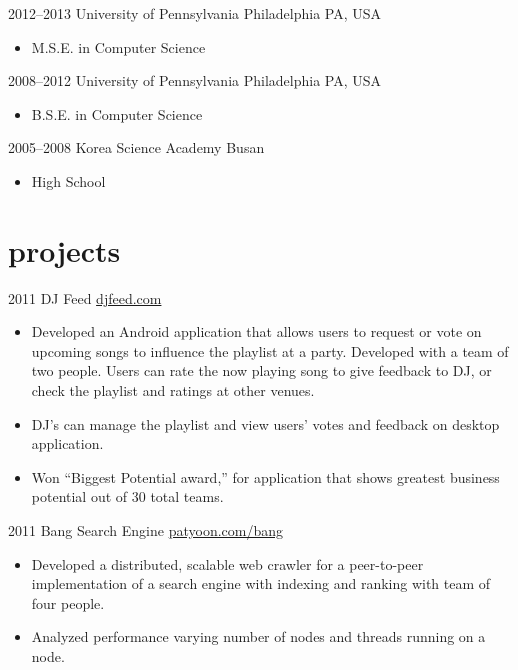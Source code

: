 \documentclass[]{patyoon-cv}
\begin{document}
\begin{entrylist}
  \entry
  {2012–2013}
  {University of Pennsylvania}
  {Philadelphia PA, USA}
  {\begin{itemize}
    \item M.S.E. in Computer Science
    \end{itemize}
  }
  \entry
  {2008–2012}
  {University of Pennsylvania}
  {Philadelphia PA, USA}
  {\begin{itemize}
    \item B.S.E. in Computer Science
    \end{itemize}}
  \entry
  {2005–2008}
  {Korea Science Academy}
  {Busan }
  {\begin{itemize}
    \item High School
    \end{itemize}}
\end{entrylist}

\section{projects}

\begin{entrylist}
  \entry
  {2011}
  {DJ Feed}
  {\href{http://djfeed.com}{djfeed.com}}
  {\begin{itemize}
    \item Developed an Android application that allows users to request or vote on upcoming songs to influence the playlist at a party. Developed with a team of two people. Users can rate the now playing song to give feedback to DJ, or check the playlist and ratings at other venues.
    \item DJ's can manage the playlist and view users' votes and feedback on desktop application.
    \item Won “Biggest Potential award,” for application that shows greatest business potential out of 30 total teams.
    \end{itemize}
  }
  \entry
  {2011}
  {Bang Search Engine}
  {\href{http://patyoon.com/bang}{patyoon.com/bang}}
  {
    \begin{itemize}
    \item Developed a distributed, scalable web crawler for a peer-to-peer implementation of a search engine with indexing and ranking with team of four people.
    \item Analyzed performance varying number of nodes and threads running on a node.
    \end{itemize}
  }
\end{entrylist}
\end{document}
